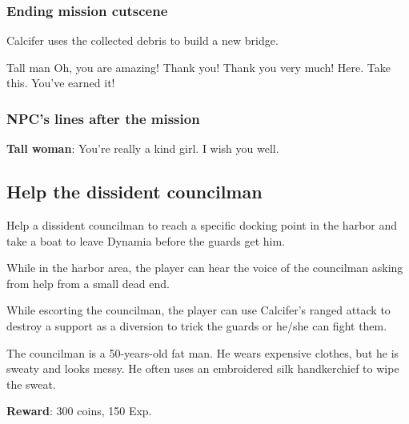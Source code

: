 \subsubsection*{Ending mission cutscene}
\begin{screenplay}

Calcifer uses the collected debris to build a new bridge.

\begin{dialogue}[excited]{Tall man}
Oh, you are amazing! Thank you! Thank you very much! Here. Take this. You've earned it!
\end{dialogue}


\end{screenplay}

\subsubsection*{NPC's lines after the mission}
\textbf{Tall woman}: You're really a kind girl. I wish you well.



\subsection{Help the dissident councilman}
Help a dissident councilman to reach a specific docking point in the harbor and take a boat to leave Dynamia before the guards get him.

While in the harbor area, the player can hear the voice of the councilman asking from help from a small dead end.

While escorting the councilman, the player can use Calcifer's ranged attack to destroy a support as a diversion to trick the guards or he/she can fight them.

The councilman is a 50-years-old fat man. He wears expensive clothes, but he is sweaty and looks messy. He often uses an embroidered silk handkerchief to wipe the sweat.

\textbf{Reward}: 300 coins, 150 Exp.


